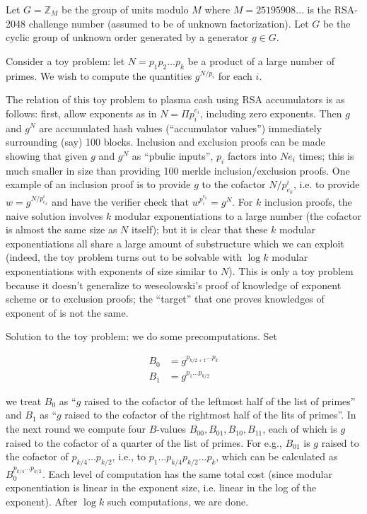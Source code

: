 \documentclass{article}
\begin{document}
Let $G = \mathbb{Z}_M$ be the group of units modulo $M$ where $M = 25195908 \ldots$ is the RSA-2048 challenge number (assumed to be of unknown factorization). Let $G$ be the cyclic group of unknown order generated by a generator $g \in G$.

Consider a toy problem: let $N = p_1 p_2 \ldots p_k$ be a product of a large number of primes. We wish to compute the quantities $g^{N/p_i}$ for each $i$.

The relation of this toy problem to plasma cash using RSA accumulators is as follows: first, allow exponents as in $N = \Pi p_i^{e_i}$, including zero exponents. Then $g$ and $g^N$ are accumulated hash values (``accumulator values'') immediately surrounding (say) 100 blocks. Inclusion and exclusion proofs can be made showing that given $g$ and $g^N$ as ``pbulic inputs'', $p_i$ factors into $N e_i$ times; this is much smaller in size than providing 100 merkle inclusion/exclusion proofs. One example of an inclusion proof is to provide $g$ to the cofactor $N/{p^i_{e_k}}$, i.e. to provide $w = g^{N/{p^i_{e_k}}}$ and have the verifier check that $w^{p_i^{e_k}} = g^N$. For $k$ inclusion proofs, the naive solution involves $k$ modular exponentiations to a large number (the cofactor is almost the same size as $N$ itself); but it is clear that these $k$ modular exponentiations all share a large amount of substructure which we can exploit (indeed, the toy problem turns out to be solvable with $\log k$ modular exponentiations with exponents of size similar to $N$). This is only a toy problem because it doesn't generalize to weseolowski's proof of knowledge of exponent scheme or to exclusion proofs; the ``target'' that one proves knowledges of exponent of is not the same.

Solution to the toy problem: we do some precomputations. Set

\begin{align*}
B_0 &= g^{p_{k/2 + 1} \ldots p_{k}} \\
B_1 &= g^{p_1 \ldots p_{k/2}}
\end{align*}

we treat $B_0$ as ``$g$ raised to the cofactor of the leftmost half of the list of primes'' and $B_1$ as ``$g$ raised to the cofactor of the rightmost half of the lits of primes''. In the next round we compute four $B$-values $B_{00}, B_{01}, B_{10}, B_{11}$, each of which is $g$ raised to the cofactor of a quarter of the list of primes. For e.g., $B_{01}$ is $g$ raised to the cofactor of $p_{k/4} \ldots p_{k/2}$, i.e., to $p_1 \ldots p_{k/4} p_{k/2} \ldots p_k$, which can be calculated as $B_0^{p_{k/4} \ldots p_{k/2}}$. Each level of computation has the same total cost (since modular exponentiation is linear in the exponent size, i.e. linear in the log of the exponent). After $\log k$ such computations, we are done.
\end{document}
